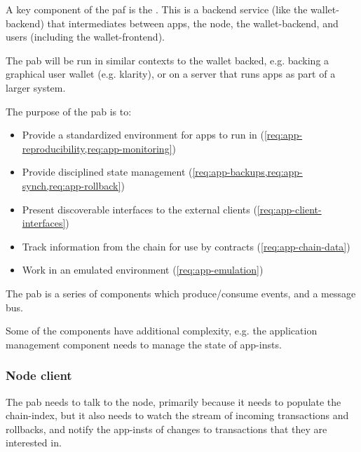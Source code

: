 \medskip

A key component of the \gls{paf} is the .
This is a backend service (like the \gls{wallet-backend}) that intermediates between \glspl{app}, the \gls{node}, the \gls{wallet-backend}, and users (including the \gls{wallet-frontend}).

The \gls{pab} will be run in similar contexts to the wallet backed, e.g. backing a graphical user wallet (e.g. \gls{klarity}), or on a server that runs \glspl{app} as part of a larger system.

The purpose of the \gls{pab} is to:
\begin{itemize}
\item Provide a standardized environment for \glspl{app} to run in (\cref{req:app-reproducibility,req:app-monitoring})
\item Provide disciplined state management (\cref{req:app-backups,req:app-synch,req:app-rollback})
\item Present discoverable interfaces to the external clients (\cref{req:app-client-interfaces})
\item Track information from the chain for use by contracts (\cref{req:app-chain-data})
\item Work in an emulated environment (\cref{req:app-emulation})
\end{itemize}

The \gls{pab} is a series of components which produce/consume events, and a message bus.

Some of the components have additional complexity, e.g. the application management component needs to manage the state of \glspl{app-inst}.

\subsubsection{Node client}
The \gls{pab} needs to talk to the \gls{node}, primarily because it needs to populate the \gls{chain-index}, but it also needs to watch the stream of incoming transactions and rollbacks, and notify the \glspl{app-inst} of changes to transactions that they are interested in.

